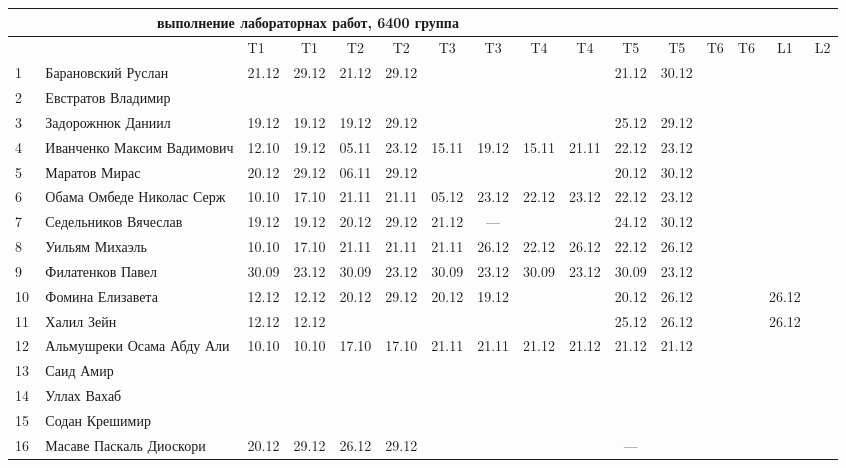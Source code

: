 \documentclass[a4paper,landscape,11pt]{article}
\begin{document}
\newpage
%
\hspace{-3.1cm} %
\begin{tabular}{l|llccc|cccc|cccccc}
\multicolumn{10}{c}{выполнение лабораторнах работ, 6400 группа} \\
\toprule
&&T1&T1& T2&T2& T3&T3& T4&T4&T5&T5&T6&T6&L1&L2\\
\midrule
1\,&  Барановский Руслан         &21.12& 29.12& 21.12& 29.12&      &      &      &      & 21.12& 30.12\\
2\,&  Евстратов Владимир         &&&&&&&&\\
3\,&  Задорожнюк Даниил          &19.12& 19.12& 19.12& 29.12&      &      &      &      & 25.12& 29.12\\
4\,&  Иванченко Максим Вадимович &12.10& 19.12& 05.11& 23.12& 15.11& 19.12& 15.11& 21.11& 22.12& 23.12\\
5\,&  Маратов Мирас              &20.12& 29.12& 06.11& 29.12&      &      &      &      & 20.12& 30.12\\
\midrule
6\,&  Обама Омбеде Николас Серж  &10.10& 17.10& 21.11& 21.11& 05.12& 23.12& 22.12& 23.12& 22.12& 23.12\\   %
7\,&  Седельников Вячеслав       &19.12& 19.12& 20.12& 29.12& 21.12&  --- &      &      & 24.12& 30.12\\
8\,&  Уильям Михаэль             &10.10& 17.10& 21.11& 21.11& 21.11& 26.12& 22.12& 26.12& 22.12& 26.12\\   %
9\,&  Филатенков Павел           &30.09 &23.12& 30.09& 23.12& 30.09& 23.12& 30.09& 23.12& 30.09& 23.12\\
10\,& Фомина Елизавета           &12.12& 12.12& 20.12& 29.12& 20.12& 19.12&      &      & 20.12& 26.12&&& 26.12\\
\midrule
11\,& Халил Зейн                 &12.12& 12.12&      &      &      &     &      &      & 25.12& 26.12&&& 26.12\\
12\,& Альмушреки Осама Абду Али  &10.10& 10.10& 17.10&17.10& 21.11&21.11& 21.12& 21.12& 21.12& 21.12\\   %
13\,& Саид Амир                  &&&&&&&&\\
14\,& Уллах Вахаб                &&&&&&&&\\
15\,& Содан Крешимир             &&&&&&&&\\
16\,& Масаве Паскаль Диоскори    &20.12& 29.12& 26.12& 29.12&     &     &      &      & ---  &     \\
\bottomrule
\end{tabular}
\end{document}
